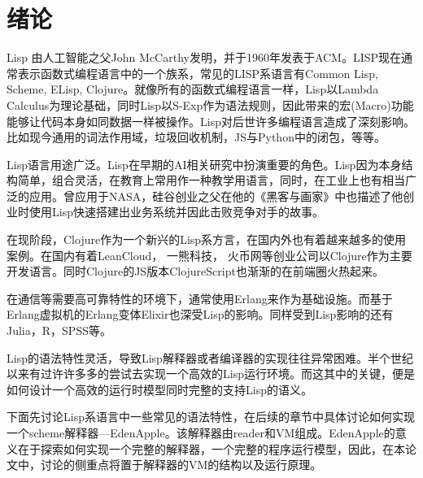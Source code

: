 %
%

\chapter{绪论}
\label{ch:intro}

Lisp 由人工智能之父John McCarthy发明，并于1960年发表于ACM\cite{mccarthy60}。LISP现在通常表示函数式编程语言中的一个族系，常见的LISP系语言有Common Lisp, Scheme, ELisp, Clojure。就像所有的函数式编程语言一样，Lisp以Lambda Calculus为理论基础，同时Lisp以S-Exp作为语法规则，因此带来的宏(Macro)功能能够让代码本身如同数据一样被操作。Lisp对后世许多编程语言造成了深刻影响。比如现今通用的词法作用域，垃圾回收机制，JS与Python中的闭包，等等。

Lisp语言用途广泛。Lisp在早期的AI相关研究中扮演重要的角色。Lisp因为本身结构简单，组合灵活，在教育上常用作一种教学用语言，同时，在工业上也有相当广泛的应用。曾应用于NASA，硅谷创业之父在他的《黑客与画家》中也描述了他创业时使用Lisp快速搭建出业务系统并因此击败竞争对手的故事。

在现阶段，Clojure作为一个新兴的Lisp系方言，在国内外也有着越来越多的使用案例。在国内有着LeanCloud， 一熊科技， 火币网等创业公司以Clojure作为主要开发语言。同时Clojure的JS版本ClojureScript也渐渐的在前端圈火热起来。

在通信等需要高可靠特性的环境下，通常使用Erlang\cite{armstrong07}来作为基础设施。而基于Erlang虚拟机的Erlang变体Elixir也深受Lisp的影响。同样受到Lisp影响的还有Julia，R，SPSS等。

Lisp的语法特性灵活，导致Lisp解释器或者编译器的实现往往异常困难。半个世纪以来有过许许多多的尝试去实现一个高效的Lisp运行环境。而这其中的关键，便是如何设计一个高效的运行时模型同时完整的支持Lisp的语义。

下面先讨论Lisp系语言中一些常见的语法特性，在后续的章节中具体讨论如何实现一个scheme解释器---EdenApple。该解释器由reader和VM组成。EdenApple的意义在于探索如何实现一个完整的解释器，一个完整的程序运行模型，因此，在本论文中，讨论的侧重点将置于解释器的VM的结构以及运行原理。
